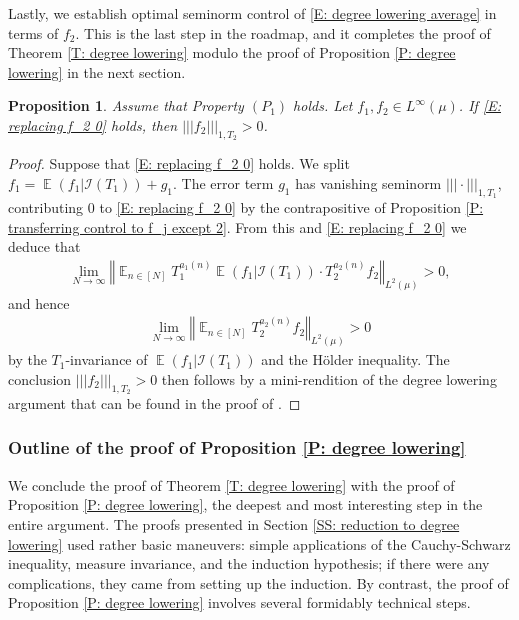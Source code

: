 \documentclass[11pt]{amsart}
\newtheorem{proposition}[lemma]{Proposition}
\theoremstyle{definition}
\DeclareMathOperator*{\E}{\mathbb{E}}
\newcommand{\CI}{{\mathcal I}}
\newcommand{\norm}[1]{\left\Vert #1\right\Vert}
\newcommand{\nnorm}[1]{\lvert\!|\!| #1|\!|\!\rvert}
\newcommand{\1}{{\mathbf{1}}}
\begin{document}
Lastly, we establish optimal seminorm control of \eqref{E: degree lowering average} in terms of $f_2$. This is the last step in the roadmap, and it completes the proof of Theorem \ref{T: degree lowering} modulo the proof of Proposition \ref{P: degree lowering} in the next section.
\begin{proposition}\label{P: transferring control to f_2}
    Assume that Property $(P_1)$ holds. Let $f_1, f_2\in L^\infty(\mu)$. %
    If \eqref{E: replacing f_2 0} holds, then $\nnorm{f_2}_{1, T_{2}}>0$.
\end{proposition}
\begin{proof}
    Suppose that \eqref{E: replacing f_2 0} holds. We split $f_1 = \E(f_1|\CI(T_1)) + g_1$.
    The error term $g_1$ has vanishing seminorm $\nnorm{\cdot}_{1, T_1}$, contributing 0 to \eqref{E: replacing f_2 0} by the contrapositive of Proposition \ref{P: transferring control to f_j except 2}. From this and \eqref{E: replacing f_2 0} we deduce that
    \begin{align*}
                \lim_{N\to\infty} \norm{\E_{n\in[N]}T_1^{{a_{1}(n)}}\E(f_1|\CI(T_1))\cdot T_{2}^{a_{2}(n)}f_2}_{L^2(\mu)} > 0,
    \end{align*}
    and hence 
    \begin{align*}
                \lim_{N\to\infty} \norm{\E_{n\in[N]}T_{2}^{a_{2}(n)}f_2}_{L^2(\mu)} > 0
    \end{align*}
    by the $T_1$-invariance of $\E(f_1|\CI(T_1))$ and the H\"older inequality.  %
    The conclusion $\nnorm{f_2}_{1, T_{2}}>0$ then follows by a mini-rendition of the degree lowering argument that can be found in the proof of \cite[Theorem 1.1]{Fr21}.
\end{proof}


\subsubsection{Outline of the proof of Proposition \ref{P: degree lowering}}
We conclude the proof of Theorem \ref{T: degree lowering} with the proof of Proposition \ref{P: degree lowering}, the deepest and most interesting step in the entire argument. The proofs presented in Section \ref{SS: reduction to degree lowering} used rather basic maneuvers: simple applications of the Cauchy-Schwarz inequality, measure invariance, and the induction hypothesis; if there were any complications, they came from setting up the induction. By contrast, the proof of Proposition \ref{P: degree lowering} involves several formidably technical steps.
\end{document}
